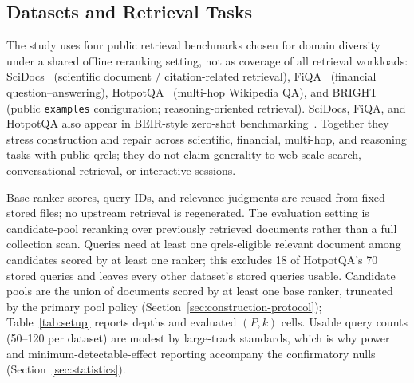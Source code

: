 \documentclass[pdflatex,sn-basic,Numbered]{sn-jnl}
\begin{document}
\subsection{Datasets and Retrieval Tasks}
\label{sec:datasets}

The study uses four public retrieval benchmarks chosen for domain diversity
under a shared offline reranking setting, not as coverage of all retrieval
workloads: SciDocs~\cite{cohan2020scidocs} (scientific document /
citation-related retrieval), FiQA~\cite{maia2018fiqa} (financial
question--answering), HotpotQA~\cite{yang2018hotpotqa} (multi-hop Wikipedia
QA), and BRIGHT~\cite{su2025bright} (public \texttt{examples} configuration;
reasoning-oriented retrieval). SciDocs, FiQA, and HotpotQA also appear in
BEIR-style zero-shot benchmarking~\cite{thakur2021beir}. Together they
stress construction and repair across scientific, financial, multi-hop, and
reasoning tasks with public qrels; they do not claim generality to web-scale
search, conversational retrieval, or interactive sessions.

Base-ranker scores, query IDs, and relevance judgments are reused from
fixed stored files; no upstream retrieval is regenerated. The evaluation
setting is candidate-pool reranking over previously retrieved documents
rather than a full collection scan. Queries need at least one
qrels-eligible relevant document among candidates scored by at least one
ranker; this excludes 18 of HotpotQA's 70 stored queries and leaves every
other dataset's stored queries usable. Candidate pools are the union of
documents scored by at least one base ranker, truncated by the primary pool
policy (Section~\ref{sec:construction-protocol}); Table~\ref{tab:setup}
reports depths and evaluated $(P,k)$ cells. Usable query counts (50--120 per
dataset) are modest by large-track standards, which is why power and
minimum-detectable-effect reporting accompany the confirmatory nulls
(Section~\ref{sec:statistics}).
\end{document}
